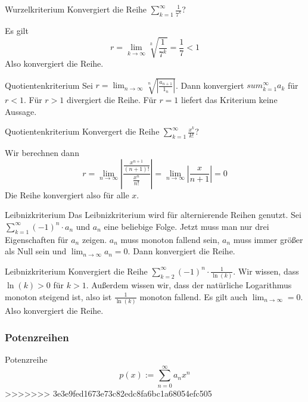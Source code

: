 \documentclass[german]{../spicker}
\begin{document}
\begin{example}{Wurzelkriterium}
    Konvergiert die Reihe $\sum_{k=1}^{\infty} \frac{1}{7^k}$?

    Es gilt
    \[
        r = \lim_{k\to\infty} \sqrt[k]{\frac{1}{7^k}} = \frac{1}{7} < 1
    \]
    Also konvergiert die Reihe.
\end{example}
\begin{algo}{Quotientenkriterium}
    Sei $r = \lim_{n\to\infty} \sqrt[n]{\left| \frac{a_{n+1}}{1_n} \right|}$.
    Dann konvergiert $sum_{k=1}^{\infty} a_k$ für $r<1$.
    Für $r>1$ divergiert die Reihe.
    Für $r=1$ liefert das Kriterium keine Aussage.
\end{algo}
\begin{example}{Quotientenkriterium}
    Konvergert die Reihe $\sum_{k=1}^{\infty} \frac{x^k}{k!}$?

    Wir berechnen dann
    \[
        r = \lim_{n\to\infty} \left| \frac{\frac{x^{n+1}}{(n+1)!}}{\frac{x^n}{n!}} \right|
        = \lim_{n\to\infty} \left| \frac{x}{n+1} \right| = 0
    \]
    Die Reihe konvergiert also für alle $x$.
\end{example}
\begin{algo}{Leibnizkriterium}
    Das Leibnizkriterium wird für alternierende Reihen genutzt.
    Sei $\sum_{k=1}^{\infty} (-1)^n \cdot a_n$ und $a_n$ eine beliebige Folge.
    Jetzt muss man nur drei Eigenschaften für $a_n$ zeigen. $a_n$ muss monoton fallend sein, $a_n$ muss immer größer als Null sein und $\lim_{n\to\infty} a_n =0$.
    Dann konvergiert die Reihe.
\end{algo}
\begin{example}{Leibnizkriterium}
    Konvergiert die Reihe $\sum_{k=2}^{\infty} (-1)^n \cdot \frac{1}{\ln(k)}$.
    Wir wissen, dass $\ln(k) > 0$ für $k>1$.
    Außerdem wissen wir, dass der natürliche Logarithmus monoton steigend ist, also ist $\frac{1}{\ln(k)}$ monoton fallend.
    Es gilt auch $\lim_{n\to\infty} = 0$. Also konvergiert die Reihe.
\end{example}

\subsubsection{Potenzreihen}

\begin{defi}{Potenzreihe}
    \[
        p(x) := \sum_{n=0}^{\infty} a_nx^n
    \]
    >>>>>>> 3e3e9fed1673e73c82edc8fa6bc1a68054efc505
\end{defi}
\end{document}
